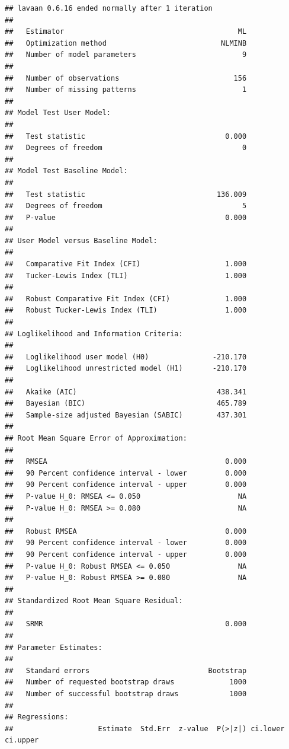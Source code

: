 \documentclass[
  11pt,
]{book}
\begin{document}
\begin{verbatim}
## lavaan 0.6.16 ended normally after 1 iteration
## 
##   Estimator                                         ML
##   Optimization method                           NLMINB
##   Number of model parameters                         9
## 
##   Number of observations                           156
##   Number of missing patterns                         1
## 
## Model Test User Model:
##                                                       
##   Test statistic                                 0.000
##   Degrees of freedom                                 0
## 
## Model Test Baseline Model:
## 
##   Test statistic                               136.009
##   Degrees of freedom                                 5
##   P-value                                        0.000
## 
## User Model versus Baseline Model:
## 
##   Comparative Fit Index (CFI)                    1.000
##   Tucker-Lewis Index (TLI)                       1.000
##                                                       
##   Robust Comparative Fit Index (CFI)             1.000
##   Robust Tucker-Lewis Index (TLI)                1.000
## 
## Loglikelihood and Information Criteria:
## 
##   Loglikelihood user model (H0)               -210.170
##   Loglikelihood unrestricted model (H1)       -210.170
##                                                       
##   Akaike (AIC)                                 438.341
##   Bayesian (BIC)                               465.789
##   Sample-size adjusted Bayesian (SABIC)        437.301
## 
## Root Mean Square Error of Approximation:
## 
##   RMSEA                                          0.000
##   90 Percent confidence interval - lower         0.000
##   90 Percent confidence interval - upper         0.000
##   P-value H_0: RMSEA <= 0.050                       NA
##   P-value H_0: RMSEA >= 0.080                       NA
##                                                       
##   Robust RMSEA                                   0.000
##   90 Percent confidence interval - lower         0.000
##   90 Percent confidence interval - upper         0.000
##   P-value H_0: Robust RMSEA <= 0.050                NA
##   P-value H_0: Robust RMSEA >= 0.080                NA
## 
## Standardized Root Mean Square Residual:
## 
##   SRMR                                           0.000
## 
## Parameter Estimates:
## 
##   Standard errors                            Bootstrap
##   Number of requested bootstrap draws             1000
##   Number of successful bootstrap draws            1000
## 
## Regressions:
##                    Estimate  Std.Err  z-value  P(>|z|) ci.lower ci.upper

\end{verbatim}
\end{document}
